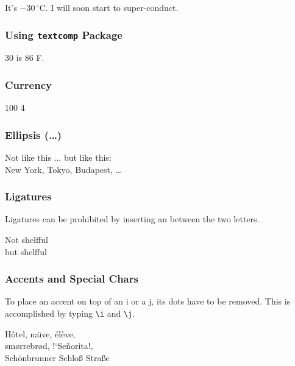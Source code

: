 \documentclass{article}
\begin{document}
It's $-30\,^{\circ}\mathrm{C}$.
I will soon start to super-conduct.

\subsubsection*{Using \texttt{textcomp} Package}

30 \textcelsius{} is
86 \textdegree{}F.

\subsubsection*{Currency}

\textbaht{} 100
\texteuro{} 4

\subsubsection*{Ellipsis (\ldots)}

Not like this ... but like this:\\
New York, Tokyo, Budapest, \ldots

\subsubsection*{Ligatures}

Ligatures can be prohibited by inserting an \mbox{} between the two letters.

\Large Not shelfful\\
but shelf\mbox{}ful

\subsubsection*{Accents and Special Chars}

To place an accent on top of an i or a j, its dots have to be removed.
This is accomplished by typing \texttt{\textbackslash i} and \texttt{\textbackslash j}.

\fbox{\i{} \j{}}

H\^otel, na\"\i ve, \'el\`eve,\\
sm\o rrebr\o d, !`Se\~norita!,\\
Sch\"onbrunner Schlo\ss{}
Stra\ss e
\end{document}
